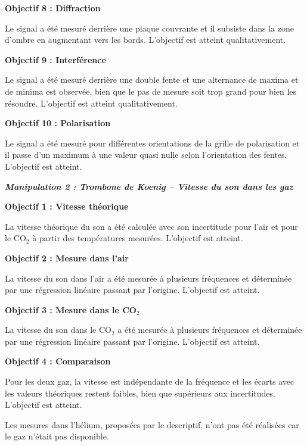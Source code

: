 \textbf{Objectif 8 : Diffraction}

Le signal a été mesuré derrière une plaque couvrante et il subsiste dans la zone d'ombre en augmentant vers les bords. L'objectif est atteint qualitativement.

\textbf{Objectif 9 : Interférence}

Le signal a été mesuré derrière une double fente et une alternance de maxima et de minima est observée, bien que le pas de mesure soit trop grand pour bien les résoudre. L'objectif est atteint qualitativement.

\textbf{Objectif 10 : Polarisation}

Le signal a été mesuré pour différentes orientations de la grille de polarisation et il passe d'un maximum à une valeur quasi nulle selon l'orientation des fentes. L'objectif est atteint.

\medskip

\textbf{\textit{Manipulation 2 : Trombone de Koenig -- Vitesse du son dans les gaz}}

\textbf{Objectif 1 : Vitesse théorique}

La vitesse théorique du son a été calculée avec son incertitude pour l'air et pour le CO$_2$ à partir des températures mesurées. L'objectif est atteint.

\textbf{Objectif 2 : Mesure dans l'air}

La vitesse du son dans l'air a été mesurée à plusieurs fréquences et déterminée par une régression linéaire passant par l'origine. L'objectif est atteint.

\textbf{Objectif 3 : Mesure dans le CO$_2$}

La vitesse du son dans le CO$_2$ a été mesurée à plusieurs fréquences et déterminée par une régression linéaire passant par l'origine. L'objectif est atteint.

\textbf{Objectif 4 : Comparaison}

Pour les deux gaz, la vitesse est indépendante de la fréquence et les écarts avec les valeurs théoriques restent faibles, bien que supérieurs aux incertitudes. L'objectif est atteint.

Les mesures dans l'hélium, proposées par le descriptif, n'ont pas été réalisées car le gaz n'était pas disponible.

